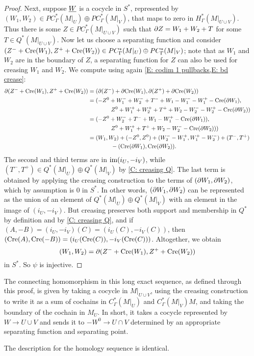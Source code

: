\begin{proof}
	Next, suppose $\underline{W}$ is a cocycle in $S^*$, represented by $(W_1,W_2) \in PC^*_\Gamma(M|_U) \oplus PC^*_\Gamma(M|_V)$, that maps to zero in $H_{\Gamma}^*(M|_{U \cup V})$.
	Thus there is
	some $Z \in PC^*_\Gamma(M|_{U \cup V})$ such that $\partial Z = W_1+W_2+T$ for some $T \in Q^*(M|_{U \cup V})$.
	Now let us choose a separating function and consider $(Z^-+\mathrm{Cre}(W_1),Z^++\mathrm{Cre}(W_2)) \in PC^*_\Gamma(M|_U) \oplus PC^*_\Gamma(M|_V)$; note that as $W_1$ and $W_2$ are in the boundary of $Z$, a separating function for $Z$ can also be used for creasing $W_1$ and $W_2$.
	We compute using again \cref{E: codim 1 pullbacks,E: bd crease}:
	\begin{align*}
		\partial (Z^-+\mathrm{Cre}(W_1),Z^++\mathrm{Cre}(W_2))& = (\partial (Z^-)+\partial \mathrm{Cre}(W_1),\partial (Z^+)+\partial\mathrm{Cre}(W_2))\\
		& = (-Z^0 + W_1^- + W_2^- + T^-+W_1 -W_1^- -W_1^+ -\mathrm{Cre}(\partial W_1),\\
		&\qquad\qquad Z^0+ W_1^++ W_2^+ + T^++W_2 -W_2^- -W_2^+ -\mathrm{Cre}(\partial W_2))\\
		& = (-Z^0 + W_2^- + T^-+W_1 -W_1^+ -\mathrm{Cre}(\partial W_1)),\\
		&\qquad\qquad Z^0+ W_1^+ + T^++W_2 -W_2^- -\mathrm{Cre}(\partial W_2)))\\
		& = (W_1,W_2)+ (-Z^0,Z^0) + (W_2^--W_1^+, W_1^+ -W_2^-) + (T^-,T^+)\\
		&\qquad\qquad -(\mathrm{Cre}(\partial W_1),\mathrm{Cre}(\partial W_2)).
	\end{align*}
	The second and third terms are in $\text{im}(i_U,-i_V)$, while $(T^-,T^+) \in Q^*(M|_U) \oplus Q^*(M|_V)$ by \cref{C: creasing Q}.
	The last term is obtained by applying the creasing construction to the terms of $(\partial W_1,\partial W_2)$, which by assumption is $0$ in $S^*$.
	In other words, $(\partial W_1,\partial W_2)$ can be represented as the union of an element of $Q^*(M|_U) \oplus Q^*(M|_V)$ with an element in the image of $(i_U,-i_V)$.
	But creasing preserves both support and membership in $Q^*$ by definition and by \cref{C: creasing Q}, and if $(A,-B) = (i_U,-i_V)(C) = (i_U(C),-i_V(C))$, then $(\mathrm{Cre}(A),\mathrm{Cre}(-B)) = (i_U(\mathrm{Cre}(C)),-i_V(\mathrm{Cre}(C)))$.
	Altogether, we obtain $$(W_1,W_2) = \partial (Z^-+\mathrm{Cre}(W_1),Z^++\mathrm{Cre}(W_2))$$ in $S^*$.
	So $\psi$ is injective.
\end{proof}

\begin{remark}\label{R: MV boundary}
	The connecting homomorphism in this long exact sequence, as defined through this proof, is given by taking a cocycle in $M|_{U \cup V}$,
	using the creasing construction to write it as a sum of cochains in $C^*_\Gamma(M|_{U})$ and $C^*_\Gamma(M|_{V})M$, and taking the boundary of the cochain in $M_U$.
	In short, it takes a cocycle represented by $W \to U \cup V$ and sends it to $-W^0 \to U \cap V$ determined by an appropriate separating function and separating point.

	The description for the homology sequence is identical.
\end{remark}

